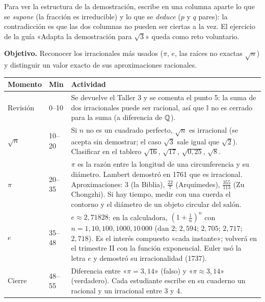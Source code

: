 \documentclass[11pt]{article}
\begin{document}
\begin{nota}
Para ver la estructura de la demostración, escribe en una columna aparte lo que se
\emph{supone} (la fracción es irreducible) y lo que se \emph{deduce} ($p$ y $q$ pares): la
contradicción es que las dos columnas no pueden ser ciertas a la vez. El ejercicio de la guía
«Adapta la demostración para $\sqrt{3}$» queda como reto voluntario.
\end{nota}


\textbf{Objetivo.} Reconocer los irracionales más usados ($\pi$, $e$, las raíces no exactas
$\sqrt{n}$) y distinguir un valor exacto de sus aproximaciones racionales.

\begin{center}
{\renewcommand{\arraystretch}{1.3}
\begin{tabularx}{\linewidth}{@{}l l X@{}}
  \toprule
  \textbf{Momento} & \textbf{Min} & \textbf{Actividad}\\
  \midrule
  Revisión & 0–10 & Se devuelve el Taller 3 y se comenta el punto 5: la suma de dos
    irracionales puede ser racional, así que $\mathbb{I}$ no es cerrado para la suma
    (a diferencia de $\mathbb{Q}$).\\
  $\sqrt{n}$ & 10–20 & Si $n$ no es un cuadrado perfecto, $\sqrt{n}$ es irracional (se acepta
    sin demostrar; el caso $\sqrt{3}$ sale igual que $\sqrt{2}$). Clasificar en el tablero
    $\sqrt{16}$, $\sqrt{17}$, $\sqrt{0{,}25}$, $\sqrt{8}$.\\
  $\pi$ & 20–35 & $\pi$ es la razón entre la longitud de una circunferencia y su diámetro.
    Lambert demostró en 1761 que es irracional. Aproximaciones: $3$ (la Biblia), $\frac{22}{7}$
    (Arquímedes), $\frac{355}{113}$ (Zu Chongzhi). Si hay tiempo, medir con una cuerda el
    contorno y el diámetro de un objeto circular del salón.\\
  $e$ & 35–48 & $e \approx 2{,}71828$: en la calculadora, $\left(1 + \frac{1}{n}\right)^n$ con
    $n = 1, 10, 100, 1000, 10\,000$ (dan $2$; $2{,}594$; $2{,}705$; $2{,}717$; $2{,}718$).
    Es el interés compuesto «cada instante»; volverá en el trimestre II con la función
    exponencial. Euler usó la letra $e$ y demostró su irracionalidad (1737).\\
  Cierre & 48–55 & Diferencia entre «$\pi = 3{,}14$» (falso) y «$\pi \approx 3{,}14$»
    (verdadero). Cada estudiante escribe en su cuaderno un racional y un irracional entre 3 y
    4.\\
  \bottomrule
\end{tabularx}}
\end{center}
\end{document}
